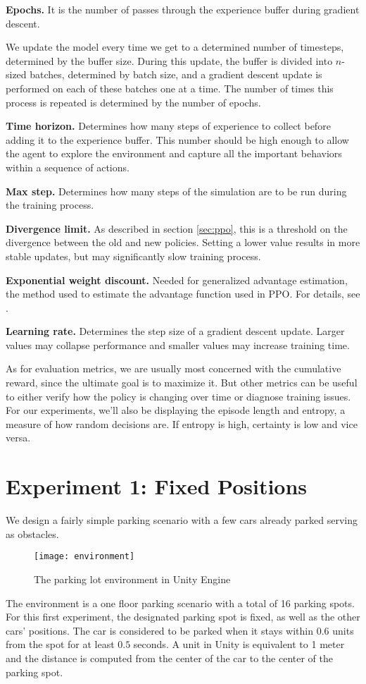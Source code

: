 \textbf{Epochs.} It is the number of passes through the experience buffer during gradient descent.

We update the model every time we get to a determined number of timesteps, determined by the buffer size. During this update, the buffer is divided into $n$-sized batches, determined by batch size, and a gradient descent update is performed on each of these batches one at a time. The number of times this process is repeated is determined by the number of epochs.

\textbf{Time horizon.} Determines how many steps of experience to collect before adding it to the experience buffer. This number should be high enough to allow the agent to explore the environment and capture all the important behaviors within a sequence of actions.

\textbf{Max step.} Determines how many steps of the simulation are to be run during the training process.

\textbf{Divergence limit.} As described in section \ref{sec:ppo}, this is a threshold on the divergence between the old and new policies. Setting a lower value results in more stable updates, but may significantly slow training process. 

\textbf{Exponential weight discount.} Needed for generalized advantage estimation, the method used to estimate the advantage function used in PPO. For details, see \cite{https://doi.org/10.48550/arxiv.1506.02438}.

\textbf{Learning rate.} Determines the step size of a gradient descent update. Larger values may collapse performance and smaller values may increase training time.

As for evaluation metrics, we are usually most concerned with the cumulative reward, since the ultimate goal is to maximize it. But other metrics can be useful to either verify how the policy is changing over time or diagnose training issues. For our experiments, we'll also be displaying the episode length and entropy, a measure of how random decisions are. If entropy is high, certainty is low and vice versa.

\section{Experiment 1: Fixed Positions}
We design a fairly simple parking scenario with a few cars already parked serving as obstacles.
\begin{figure}
    \texttt{[image: environment]}
    \caption{The parking lot environment in Unity Engine}
\end{figure}
The environment is a one floor parking scenario with a total of 16 parking spots. For this first experiment, the designated parking spot is fixed, as well as the other cars' positions. The car is considered to be parked when it stays within $0.6$ units from the spot for at least $0.5$ seconds. A unit in Unity is equivalent to 1 meter and the distance is computed from the center of the car to the center of the parking spot.

